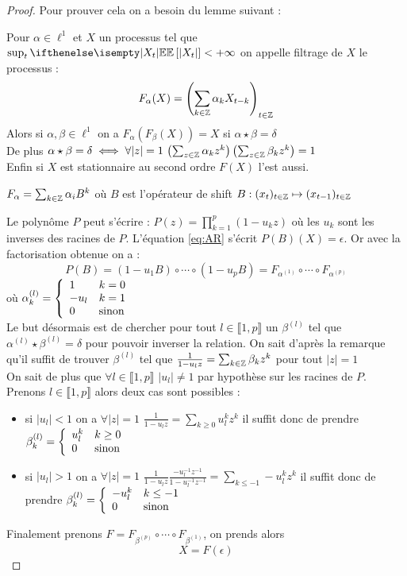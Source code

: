 \documentclass[a4paper,french]{article}
\begin{document}
\begin{proof}
Pour prouver cela on a besoin du lemme suivant :
\begin{Lem}
Pour $\alpha \in \ell^1$ et $X$ un processus tel que $\sup_t \EE[|X_t|] < +\infty$ on appelle filtrage de $X$ le processus : 
\[ F_\alpha(X) = \left( \sum_{k\in \mathbb{Z}} \alpha_k X_{t-k} \right)_{t\in \mathbb{Z}} \]
Alors si $\alpha,\beta \in \ell^1$ on a $F_\alpha (F_\beta (X)) = X$ si $\alpha \star \beta = \delta$ \\
De plus $\alpha \star \beta = \delta \iff \forall |z|=1 \, \left( \sum_{z\in \mathbb{Z}} \alpha_k z^k \right) \left( \sum_{z\in \mathbb{Z}} \beta_k z^k \right) =1 $ \\
Enfin si $X$ est stationnaire au second ordre $F(X)$ l'est aussi.
\end{Lem}
\begin{Rque}
$F_\alpha = \sum_{k\in \mathbb{Z}} \alpha_i B^k$ où $B$ est l'opérateur de shift $ B : (x_t)_{t\in \mathbb{Z}} \mapsto (x_{t-1})_{t\in \mathbb{Z}}$
\end{Rque}

Le polynôme $P$ peut s'écrire : $P(z)=\prod_{k=1}^p (1-u_k z)$ où les $u_k$ sont les inverses des racines de $P$. L'équation \eqref{eq:AR} s'écrit $P(B)(X)=\epsilon$. Or avec la factorisation obtenue on a : 
\[
P(B) = (1-u_1 B) \circ \cdots \circ (1-u_p B) = F_{\alpha^{(1)}} \circ \cdots \circ F_{\alpha^{(p)}}
\]
où $\alpha_k^{(l)} = { \left\lbrace \begin{array}{ll} 
1 & k=0 \\
-u_l & k=1 \\
0 & \text{sinon} \\ \end{array} \right. }
$ \\
Le but désormais est de chercher pour tout $l \in \llbracket 1, p \rrbracket$ un $\beta^{(l)}$ tel que $\alpha^{(l)} \star \beta^{(l)} = \delta$ pour pouvoir inverser la relation. On sait d'après la remarque qu'il suffit de trouver $\beta^{(l)}$ tel que $\frac{1}{1-u_l z} = \sum_{k \in \mathbb{Z}} \beta_k z^k$ pour tout $|z|=1$ \\
On sait de plus que $\forall l \in \llbracket 1, p \rrbracket$ $|u_l| \neq 1$ par hypothèse sur les racines de $P$.\\
Prenons $l\in \llbracket 1,p \rrbracket$ alors deux cas sont possibles :
\begin{itemize}
\item si $|u_l|< 1$ on a $\forall |z|=1$ $\frac{1}{1-u_l z} = \sum_{k \geq 0} u_l^k z^k$ il suffit donc de prendre $\beta_k^{(l)} = { \left\lbrace \begin{array}{ll} 
u_l^k & k \geq 0 \\
0 & \text{sinon} \\
 \end{array} \right. }$
\item si $|u_l|> 1$ on a $\forall |z|=1$ $\frac{1}{1-u_l z} \frac{-u_l^{-1} z^{-1}}{1-u_l^{-1} z^{-1}} = \sum_{k \leq -1} -u_l^k z^k$ il suffit donc de prendre $\beta_k^{(l)} = { \left\lbrace \begin{array}{ll} 
-u_l^k & k \leq -1 \\
0 & \text{sinon} \\
 \end{array} \right. }$
\end{itemize}
Finalement prenons $F = F_{\beta^{(p)}} \circ \cdots \circ F_{\beta^{(1)}}$, on prends alors 
\[
X = F(\epsilon) 
\]
\end{proof}
\end{document}
